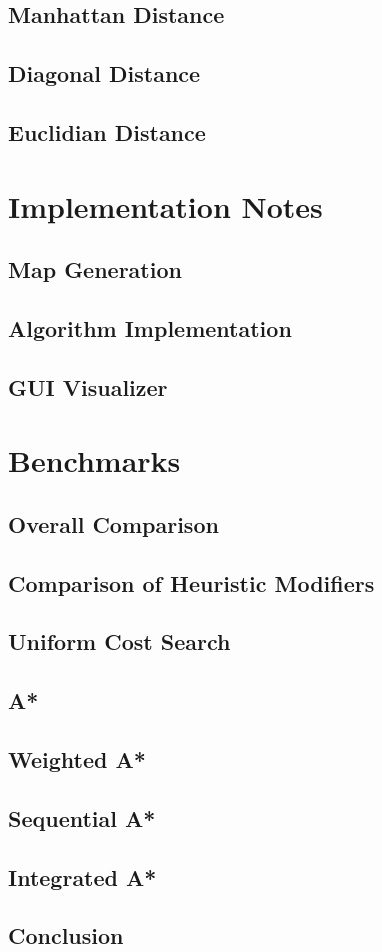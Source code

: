 \documentclass[11pt,draft]{article}
\begin{document}
\subsection{Manhattan Distance}

\subsection{Diagonal Distance}

\subsection{Euclidian Distance}


\section{Implementation Notes}

\subsection{Map Generation}

\subsection{Algorithm Implementation}

\subsection{GUI Visualizer}

\section{Benchmarks}

\subsection{Overall Comparison}
\subsection{Comparison of Heuristic Modifiers}
\subsection{Uniform Cost Search}
\subsection{A*}
\subsection{Weighted A*}
\subsection{Sequential A*}
\subsection{Integrated A*}
\subsection{Conclusion}
\end{document}
